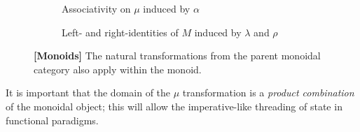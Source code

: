 \documentclass[10pt,a4paper,reqno]{amsart}
\numberwithin{equation}{section}
\numberwithin{figure}{section}
\begin{document}
\vspace{-2em}
\begin{figure}[ht]
        \begin{subfigure}{\textwidth}
                \centering
                \caption{Associativity on $\mu$ induced by $\alpha$}
        \end{subfigure}

        \begin{subfigure}{\textwidth}
                \centering
                \caption{Left- and right-identities of $M$ induced by $\lambda$
                        and $\rho$}
        \end{subfigure}%
        \caption{\textbf{[Monoids]} The natural transformations from the parent
                monoidal category also apply within the monoid.}
        \vspace{1.5em}
        \label{fig:monoid-commute}
\end{figure}

It is important that the domain of the $\mu$
transformation is a \emph{product combination} of the monoidal object; this will
allow the imperative-like threading of state in functional paradigms.
\end{document}
